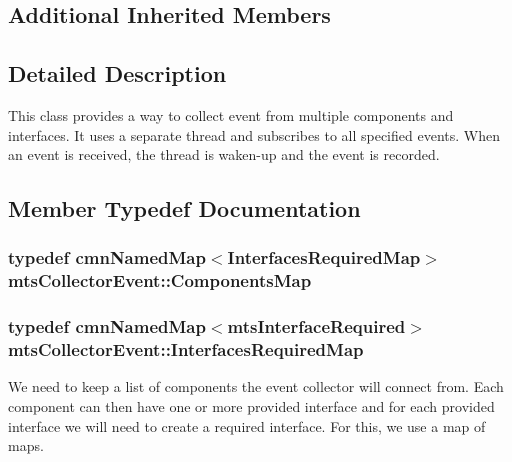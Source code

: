 \subsection*{Additional Inherited Members}


\subsection{Detailed Description}
This class provides a way to collect event from multiple components and interfaces. It uses a separate thread and subscribes to all specified events. When an event is received, the thread is waken-\/up and the event is recorded. 

\subsection{Member Typedef Documentation}
\hypertarget{classmts_collector_event_a06ae73259368d52dfbde74f94a3b1dfb}{}
\subsubsection[{Components\+Map}]{\setlength{\rightskip}{0pt plus 5cm}typedef {\bf cmn\+Named\+Map}$<${\bf Interfaces\+Required\+Map}$>$ {\bf mts\+Collector\+Event\+::\+Components\+Map}\hspace{0.3cm}{\ttfamily [protected]}}\label{classmts_collector_event_a06ae73259368d52dfbde74f94a3b1dfb}
\hypertarget{classmts_collector_event_ac8f5ef3f2d36cef5c1dc78cb35fc79bd}{}
\subsubsection[{Interfaces\+Required\+Map}]{\setlength{\rightskip}{0pt plus 5cm}typedef {\bf cmn\+Named\+Map}$<${\bf mts\+Interface\+Required}$>$ {\bf mts\+Collector\+Event\+::\+Interfaces\+Required\+Map}\hspace{0.3cm}{\ttfamily [protected]}}\label{classmts_collector_event_ac8f5ef3f2d36cef5c1dc78cb35fc79bd}
We need to keep a list of components the event collector will connect from. Each component can then have one or more provided interface and for each provided interface we will need to create a required interface. For this, we use a map of maps. 

